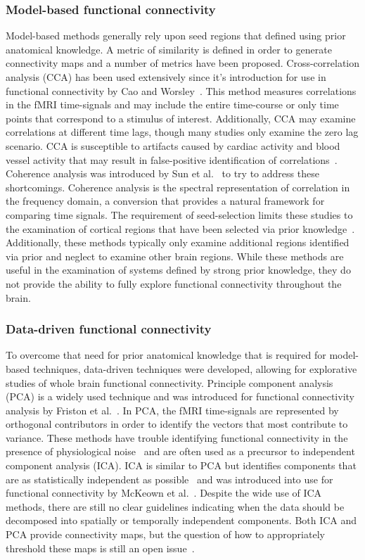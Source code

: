 \subsubsection{Model-based functional connectivity}
Model-based methods generally rely upon seed regions that defined using prior anatomical knowledge. A metric of similarity is defined in order to generate connectivity maps and a number of metrics have been proposed. Cross-correlation analysis (CCA) has been used extensively since it's introduction for use in functional connectivity by Cao and Worsley~\cite{Cao1999}. This method measures correlations in the fMRI time-signals and may include the entire time-course or only time points that correspond to a stimulus of interest. Additionally, CCA may examine correlations at different time lags, though many studies only examine the zero lag scenario. CCA is susceptible to artifacts caused by cardiac activity and blood vessel activity that may result in false-positive identification of correlations~\cite{Friston1995}. Coherence analysis was introduced by Sun et al.\ \cite{Sun2004} to try to address these shortcomings. Coherence analysis is the spectral representation of correlation in the frequency domain, a conversion that provides a natural framework for comparing time signals. The requirement of seed-selection limits these studies to the examination of cortical regions that have been selected via prior knowledge~\cite{Ma2007}. Additionally, these methods typically only examine additional regions identified via prior and neglect to examine other brain regions. While these methods are useful in the examination of systems defined by strong prior knowledge, they do not provide the ability to fully explore functional connectivity throughout the brain.

\subsubsection{Data-driven functional connectivity}
To overcome that need for prior anatomical knowledge that is required for model-based techniques, data-driven techniques were developed, allowing for explorative studies of whole brain functional connectivity. Principle component analysis (PCA) is a widely used technique and was introduced for functional connectivity analysis by Friston et al.\ \cite{Friston1993}. In PCA, the fMRI time-signals are represented by orthogonal contributors in order to identify the vectors that most contribute to variance. These methods have trouble identifying functional connectivity in the presence of physiological noise~\cite{Baumgartner2000} and are often used as a precursor to independent component analysis (ICA). ICA is similar to PCA but identifies components that are as statistically independent as possible~\cite{Hyvaerinen2000} and was introduced into use for functional connectivity by McKeown et al.\ \cite{McKeown1998}. Despite the wide use of ICA methods, there are still no clear guidelines indicating when the data should be decomposed into spatially or temporally independent components. Both ICA and PCA provide connectivity maps, but the question of how to appropriately threshold these maps is still an open issue~\cite{Ma2007}. 

